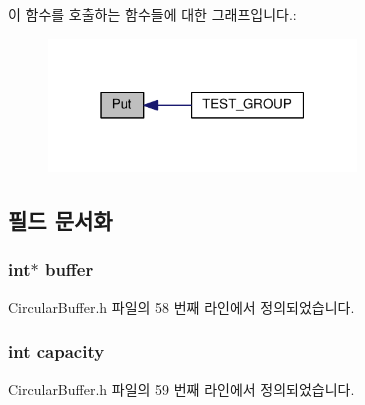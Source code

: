 이 함수를 호출하는 함수들에 대한 그래프입니다.\+:
\nopagebreak
\begin{figure}[H]
\begin{center}
\leavevmode
\includegraphics[width=232pt]{class_circular_buffer_acb614e0e762b045fef30b8a65d53b9d2_icgraph}
\end{center}
\end{figure}




\subsection{필드 문서화}
\subsubsection[{\texorpdfstring{buffer}{buffer}}]{\setlength{\rightskip}{0pt plus 5cm}int$\ast$ buffer\hspace{0.3cm}{\ttfamily [private]}}\hypertarget{class_circular_buffer_a74c07922a00b8d07d761cfc6e03ae354}{}\label{class_circular_buffer_a74c07922a00b8d07d761cfc6e03ae354}


Circular\+Buffer.\+h 파일의 58 번째 라인에서 정의되었습니다.

\subsubsection[{\texorpdfstring{capacity}{capacity}}]{\setlength{\rightskip}{0pt plus 5cm}int capacity\hspace{0.3cm}{\ttfamily [private]}}\hypertarget{class_circular_buffer_adbe66a087ac3fd4a5b0566f64ca2d12b}{}\label{class_circular_buffer_adbe66a087ac3fd4a5b0566f64ca2d12b}


Circular\+Buffer.\+h 파일의 59 번째 라인에서 정의되었습니다.

